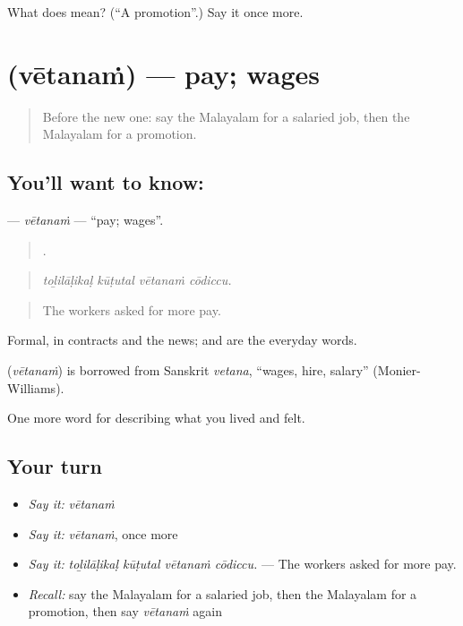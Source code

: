 \begin{tcolorbox}[breakable,colback=teal!4,colframe=teal!35!black,title={Before you move on}]
What does  mean? (\textquotedblleft{}A promotion\textquotedblright{}.) Say it once more.
\end{tcolorbox}
\section[\texorpdfstring{\ml{വേതനം} (vētanaṁ)}{വേതനം (vētanaṁ)}]{ (vētanaṁ) — pay; wages}

\label{lesson:ML-C542-vetanam}



\begin{quote}
Before the new one: say the Malayalam for a salaried job, then the Malayalam for a promotion.
\end{quote}

\subsection*{You'll want to know: }
\textbf{} — \emph{vētanaṁ} — \textquotedblleft{}pay; wages\textquotedblright{}.

\begin{quote}
   .
\end{quote}

\begin{quote}
\emph{toḻilāḷikaḷ kūṭutal vētanaṁ cōdiccu.}
\end{quote}

\begin{quote}
The workers asked for more pay.
\end{quote}

Formal, in contracts and the news;  and  are the everyday words.

\begin{cousinweb}
\textbf{} (\emph{vētanaṁ}) is borrowed from Sanskrit \emph{vetana}, \textquotedblleft{}wages, hire, salary\textquotedblright{} (Monier-Williams).
\end{cousinweb}

\begin{grammarlens}[title={What you've built}]
One more word for describing what you lived and felt.
\end{grammarlens}

\subsection*{Your turn}
\begin{itemize}
\raggedright
  \item \emph{Say it:} \emph{vētanaṁ}
  \item \emph{Say it:} \emph{vētanaṁ}, once more
  \item \emph{Say it:} \emph{toḻilāḷikaḷ kūṭutal vētanaṁ cōdiccu.} — The workers asked for more pay.
  \item \emph{Recall:} say the Malayalam for a salaried job, then the Malayalam for a promotion, then say \emph{vētanaṁ} again
\end{itemize}

